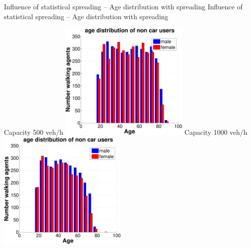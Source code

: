 \createfigure%
{Influence of statistical spreading -- Age distribution with spreading}%
{Influence of statistical spreading -- Age distribution with spreading}%
{\label{fig:statisticalSpreadingAgeDistributionWithSpreading}}%
{%
  \createsubfigure%
  {Capacity 500 veh/h}%
  {\includegraphics[width=0.47\textwidth, angle=0, trim=0mm 0mm 0mm 9mm, clip=true]{extending/figures/MultiModalSimulation/simulations/age_distribution_500}}%
  {\label{}}%
  {\hspace{3mm}}%
  \createsubfigure%
  {Capacity 1000 veh/h}%
  {\includegraphics[width=0.47\textwidth, angle=0, trim=0mm 0mm 0mm 9mm, clip=true]{extending/figures/MultiModalSimulation/simulations/age_distribution_1000}}%
  {\label{}}%
  {\vspace{5.5mm}}%

}
